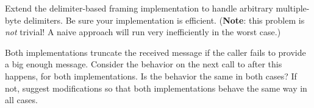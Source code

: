 \begin{exercises}
\item
Extend the delimiter-based framing implementation to handle
arbitrary multiple-byte delimiters.  Be sure your implementation is
efficient.  (\textbf{Note}: this problem is \emph{not\/} trivial!  A naive
approach will run very inefficiently in the worst case.)

\item
Both  implementations truncate the received message
if the caller fails to provide a big enough message.  Consider the
behavior on the next call to  after this happens,
for both implementations.  Is the behavior the same in both cases?
If not, suggest modifications so that both implementations behave the
same way in all cases.
\end{exercises}
